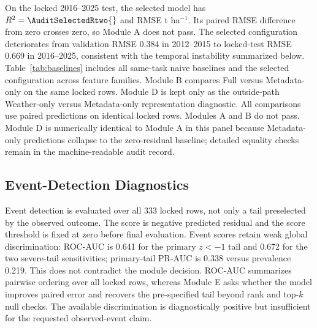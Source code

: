\documentclass[conference]{IEEEtran}
\begin{document}
On the locked 2016--2025 test, the selected model has
$R^2=\AuditSelectedRtwo{}$ and RMSE
\AuditSelectedRMSE{} t ha$^{-1}$. Its paired RMSE difference from zero crosses
zero, so Module A does not pass. The selected configuration deteriorates from validation
RMSE 0.384 in 2012--2015 to locked-test RMSE 0.669 in 2016--2025, consistent with
the temporal instability summarized below. Table~\ref{tab:baselines} includes all
same-task naive baselines and the selected configuration across feature families.
Module B compares Full versus Metadata-only on the same locked rows. Module D is
kept only as the outside-path Weather-only versus Metadata-only representation
diagnostic. All comparisons use paired predictions on identical locked rows.
Modules A and B do not pass. Module D is numerically identical to Module A in
this panel because Metadata-only predictions collapse to the zero-residual
baseline; detailed equality checks remain in the machine-readable audit record.

\begin{table}[t]
\centering
\caption{Locked 2016--2025 same-task audit. Learned-model predictions are seed
aggregated. $\Delta$RMSE is model minus zero-residual RMSE with paired 95\%
year-block intervals; RMSE is t ha$^{-1}$. The Module B contrast is computed
directly as Full-minus-Metadata; in this panel it matches Full-minus-zero
because Metadata-only predictions coincide with the zero-residual vector to
floating-point precision.}
\label{tab:baselines}
\scriptsize
\resizebox{\textwidth}{!}{}
\end{table}

\subsection{Event-Detection Diagnostics}
Event detection is evaluated over all 333 locked rows, not only a tail preselected
by the observed outcome. The score is negative predicted residual and the score
threshold is fixed at zero before final evaluation. Event scores retain weak
global discrimination: ROC-AUC is 0.641 for the primary $z<-1$ tail and 0.672 for
the two severe-tail sensitivities; primary-tail PR-AUC is 0.338 versus prevalence
0.219. This does not contradict the module decision. ROC-AUC summarizes pairwise
ordering over all locked rows, whereas Module E asks whether the model improves
paired error and recovers the pre-specified tail beyond rank and top-$k$ null
checks. The available discrimination is diagnostically positive but insufficient
for the requested observed-event claim.
\end{document}
